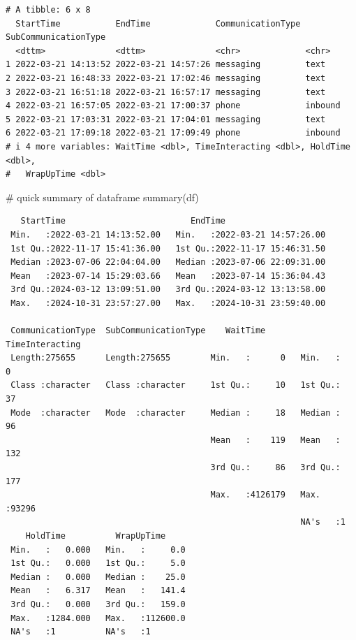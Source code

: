 \documentclass[
  letterpaper,
  DIV=11,
  numbers=noendperiod]{scrartcl}
\newenvironment{Shaded}{\begin{snugshade}}{\end{snugshade}}
\newcommand{\CommentTok}[1]{\textcolor[rgb]{0.37,0.37,0.37}{#1}}
\newcommand{\FunctionTok}[1]{\textcolor[rgb]{0.28,0.35,0.67}{#1}}
\newcommand{\NormalTok}[1]{\textcolor[rgb]{0.00,0.23,0.31}{#1}}
\begin{document}
\begin{verbatim}
# A tibble: 6 x 8
  StartTime           EndTime             CommunicationType SubCommunicationType
  <dttm>              <dttm>              <chr>             <chr>               
1 2022-03-21 14:13:52 2022-03-21 14:57:26 messaging         text                
2 2022-03-21 16:48:33 2022-03-21 17:02:46 messaging         text                
3 2022-03-21 16:51:18 2022-03-21 16:57:17 messaging         text                
4 2022-03-21 16:57:05 2022-03-21 17:00:37 phone             inbound             
5 2022-03-21 17:03:31 2022-03-21 17:04:01 messaging         text                
6 2022-03-21 17:09:18 2022-03-21 17:09:49 phone             inbound             
# i 4 more variables: WaitTime <dbl>, TimeInteracting <dbl>, HoldTime <dbl>,
#   WrapUpTime <dbl>
\end{verbatim}

\begin{Shaded}
\begin{Highlighting}[]
\CommentTok{\# quick summary of dataframe}
\FunctionTok{summary}\NormalTok{(df)}
\end{Highlighting}
\end{Shaded}

\begin{verbatim}
   StartTime                         EndTime                      
 Min.   :2022-03-21 14:13:52.00   Min.   :2022-03-21 14:57:26.00  
 1st Qu.:2022-11-17 15:41:36.00   1st Qu.:2022-11-17 15:46:31.50  
 Median :2023-07-06 22:04:04.00   Median :2023-07-06 22:09:31.00  
 Mean   :2023-07-14 15:29:03.66   Mean   :2023-07-14 15:36:04.43  
 3rd Qu.:2024-03-12 13:09:51.00   3rd Qu.:2024-03-12 13:13:58.00  
 Max.   :2024-10-31 23:57:27.00   Max.   :2024-10-31 23:59:40.00  
                                                                  
 CommunicationType  SubCommunicationType    WaitTime       TimeInteracting
 Length:275655      Length:275655        Min.   :      0   Min.   :    0  
 Class :character   Class :character     1st Qu.:     10   1st Qu.:   37  
 Mode  :character   Mode  :character     Median :     18   Median :   96  
                                         Mean   :    119   Mean   :  132  
                                         3rd Qu.:     86   3rd Qu.:  177  
                                         Max.   :4126179   Max.   :93296  
                                                           NA's   :1      
    HoldTime          WrapUpTime      
 Min.   :   0.000   Min.   :     0.0  
 1st Qu.:   0.000   1st Qu.:     5.0  
 Median :   0.000   Median :    25.0  
 Mean   :   6.317   Mean   :   141.4  
 3rd Qu.:   0.000   3rd Qu.:   159.0  
 Max.   :1284.000   Max.   :112600.0  
 NA's   :1          NA's   :1         
\end{verbatim}
\end{document}
